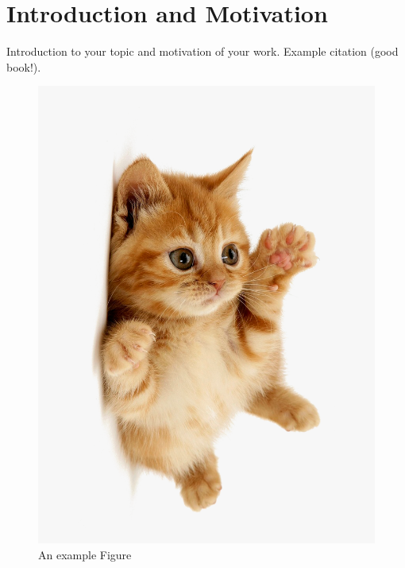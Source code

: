 \section{Introduction and Motivation}\label{sec:introduction}

Introduction to your topic and motivation of your work.
Example citation \cite{bishopPatternRecognitionMachine2006} (good book!).

\lipsum[2-4]

\begin{figure}[t]
	\centering
	\includegraphics[height=0.3\textheight]{Graphics/cat_cute}
	\caption{An example Figure}\label{fig:example}
\end{figure}

\lipsum[5]
